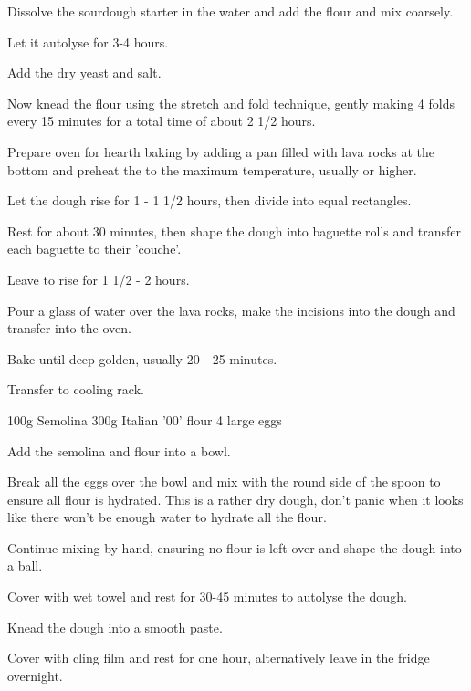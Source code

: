 \begin{method}		
     	Dissolve the sourdough starter in the water and add the flour and mix coarsely.

	Let it autolyse for 3-4 hours.

	Add the dry yeast and salt.

	Now knead the flour using the stretch and fold technique, gently making 4 folds  every 15 minutes for a total time of about 2 1/2 hours.

	Prepare oven for hearth baking by adding a pan filled with lava rocks at the bottom and preheat the to the maximum temperature, usually  or higher.

	Let the dough rise for 1 - 1 1/2 hours, then divide into equal rectangles.

	Rest for about 30 minutes, then shape the dough into baguette rolls and transfer each baguette to their 'couche'.

	Leave to rise for 1 1/2 - 2 hours.

	Pour a glass of water over the lava rocks, make the incisions into the dough and transfer into the oven.

	Bake until deep golden,  usually 20 - 25 minutes.

	Transfer to cooling rack.

\end {method}

\label{rec:egg-pasta}

\begin{ingreds}
	100g Semolina
	300g Italian '00' flour
	4 large eggs 

\end{ingreds}

\begin{method}		
     	Add the semolina and flour into a bowl.

	Break all the eggs over the bowl and mix with the round side of the spoon to ensure all flour is hydrated.  This is a rather dry dough, don't panic when it looks like there won't be enough water to hydrate all the flour.

	Continue mixing by hand, ensuring no flour is left over and shape the dough into a ball.

	Cover with wet towel and rest for 30-45 minutes to autolyse the dough.

	Knead the dough into a smooth paste.

	Cover with cling film and rest for one hour, alternatively leave in the fridge overnight.

\end {method}
